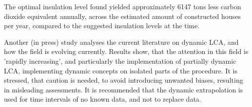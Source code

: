 The optimal insulation level found yielded approximately 6147 tons less carbon dioxide equivalent annually, across the estimated amount of constructed houses per year, compared to the suggested insulation levels at the time.\cite{DREM_Analysis}

Another (in press) study analyses the current literature on dynamic LCA, and how the field is evolving currently. Results show, that the attention in this field is 'rapidly increasing', and particularly the implementation of partially dynamic LCA, implementing dynamic concepts on isolated parts of the procedure. 
It is stressed, that caution is needed, to avoid introducing unwanted biases, resulting in misleading assessments. It is recommended that the dynamic extrapolation is used for time intervals of no known data, and not to replace data.\cite{DLCALitteratureAnalysis}